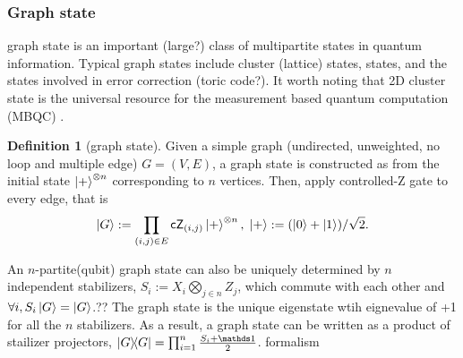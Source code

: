 \documentclass[
10pt,
aps,
pra,
linenumbers,
floatfix,
]{revtex4-2}
\theoremstyle{plain}
\newtheorem{question}{Question}
\theoremstyle{definition}
\newtheorem{definition}{Definition}
\newtheorem{remark}{Remark}
\begin{document}


\subsubsection{Graph state}\label{sec:graph_state}
graph state is an important (large?) class of multipartite states in quantum information.
Typical graph states include cluster (lattice) states,  states, and the states involved in error correction (toric code?).
It worth noting that 2D cluster state is the universal resource for the measurement based quantum computation (MBQC) \cite{briegelMeasurementbasedQuantumComputation2009}.
\begin{definition}[graph state]\label{def:graph_state}
	Given a simple graph (undirected, unweighted, no loop and multiple edge) $G=(V,E)$, a graph state is constructed as 
	from the initial state $\ket{+}^{\otimes n}$ corresponding to $n$ vertices.
	Then, apply controlled-Z gate to every edge, that is 
	\begin{equation}
		\ket{G}:=\prod_{(i,j)\in E}\textsf{cZ}_{(i,j)} \ket{+}^{\otimes n}
		,\;\ket{+}: = (\ket{0}+\ket{1})/\sqrt{2} .
	\end{equation}
\end{definition}
An $n$-partite(qubit) graph state can also be uniquely determined by $n$ independent stabilizers, 
$S_i:= X_i \bigotimes_{j\in n}Z_j$, 
which commute with each other and $\forall i,S_i\ket{G}=\ket{G}$.??
The graph state is the unique eigenstate wtih eignevalue of +1 for all the $n$ stabilizers.
As a result, a graph state can be written as a product of stailizer projectors, $\op{G}=\prod_{i=1}^n \frac{S_i +\identity}{2}$.
 formalism
\end{document}
